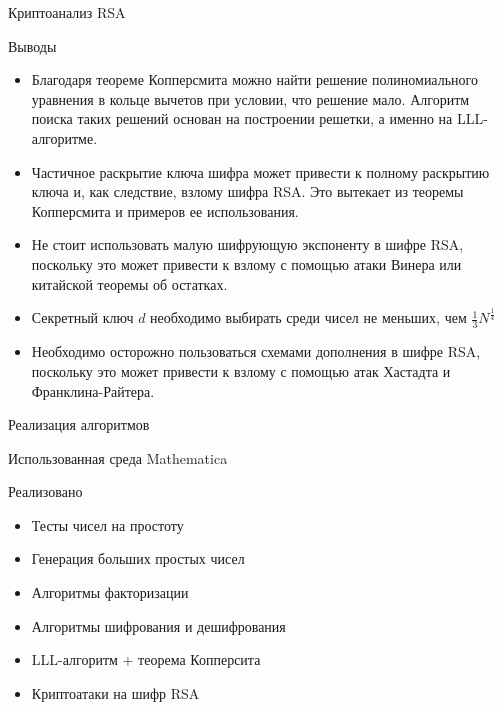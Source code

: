 \begin{frame}{Криптоанализ RSA}	
	\begin{center}
		{\LARGE Выводы }

		\changefontsizes{8pt}

		\begin{itemize}
			\item Благодаря теореме Копперсмита можно найти решение полиномиального уравнения в кольце вычетов при условии, что решение мало. Алгоритм поиска таких решений основан на построении решетки, а именно на LLL-алгоритме.
	      	\item Частичное раскрытие ключа шифра может привести к полному раскрытию ключа и, как следствие, взлому шифра RSA. Это вытекает из теоремы Копперсмита и примеров ее использования.
	      	\item Не стоит использовать малую шифрующую экспоненту в шифре RSA, поскольку это может привести к взлому с помощью атаки Винера или китайской теоремы об остатках.
	      	\item Секретный ключ $d$ необходимо выбирать среди чисел не меньших, чем $\frac{1}{3} N^{\frac{1}{4}}$
	      	\item Необходимо осторожно пользоваться схемами дополнения в шифре RSA, поскольку это может привести к взлому с помощью атак Хастадта и Франклина-Райтера.
		\end{itemize}

		\changefontsizes{13pt}
	\end{center}	
\end{frame}

\begin{frame}{Реализация алгоритмов}			

	\begin{block}{Использованная среда}
		Mathematica
	\end{block}	 
	
	\begin{block}{Реализовано}
		\begin{itemize}
	        \item Тесты чисел на простоту
	        \item Генерация больших простых чисел
	        \item Алгоритмы факторизации
	        \item Алгоритмы шифрования и дешифрования
	        \item LLL-алгоритм + теорема Копперсита
	        \item Криптоатаки на шифр RSA
		\end{itemize}
	\end{block}	 
	
\end{frame}